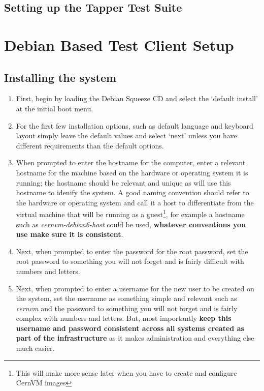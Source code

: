 \subsection{Setting up the Tapper Test Suite}

\section{Debian Based Test Client Setup}
\subsection{Installing the system}
\flushleft
\begin{enumerate}
\item First, begin by loading the Debian Squeeze CD and select the `default install' at the initial boot menu.

\item For the first few installation options, such as default language and keyboard layout simply leave the default values and select
`next' unless you have different requirements than the default options.

\item When prompted to enter the hostname for the computer, enter a relevant hostname for the machine based on the hardware or operating
system it is running; the hostname should be relevant and unique as \tapper will use this hostname to idenify the system. A good naming
convention should refer to the hardware or operating system and call it a host to differentiate from the virtual machine that will be
running as a guest\footnote{This will make more sense later when you have to create and configure CernVM images}, for example a hostname such
as \emph{cernvm-debian6-host} could be used, {\bf whatever conventions you use make sure it is consistent}.

\item Next, when prompted to enter the password for the root password, set the root password to something you will not forget and is fairly
difficult with numbers and letters.

\item Next, when prompted to enter a username for the new user to be created on the system, set the username as something simple and relevant
such as \emph{cernvm} and the password to something you will not forget and is fairly complex with numbers and letters. But, most importantly 
{\bf keep this username and password consistent across all systems created as part of the infrastructure} as it makes administration and everything
else much easier.


\end{enumerate}
